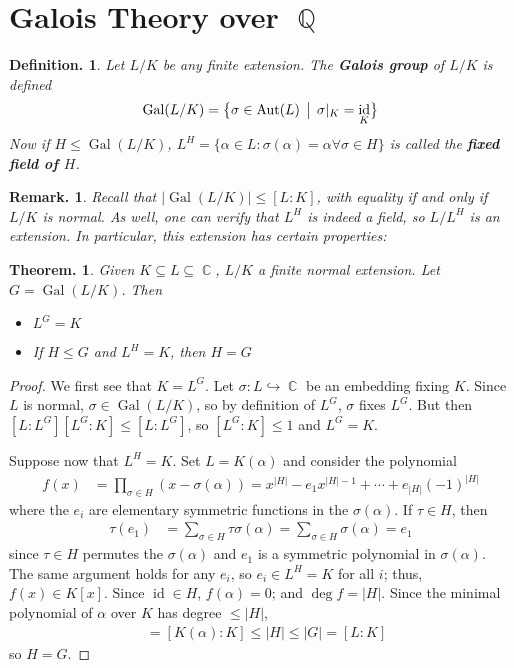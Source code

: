 \documentclass[11pt, a4paper]{memoir}
\DeclareMathOperator{\Q}{{\mathbb{Q}}}
\DeclareMathOperator{\C}{{\mathbb{C}}}
\newcommand{\hto}[0]{\ensuremath{\hookrightarrow}}
\theoremstyle{change}
\newtheorem{theorem}{Theorem.}[section]
\theoremstyle{plain}
\theoremstyle{nonumberplain}
\newtheorem{definition}{Definition.}
\newtheorem{remark}{Remark.}
\newtheorem{proof}{Proof}
\DeclareMathOperator{\Aut}{Aut}
\DeclareMathOperator{\Gal}{Gal}
\DeclareMathOperator{\id}{id}
\newcommand{\mbf}[1]{{\boldmath\bfseries #1}}
\numberwithin{equation}{section}
\begin{document}
\section{Galois Theory over \texorpdfstring{$\Q$}{Q}}
\begin{definition}
    Let $L/K$ be any finite extension.
    The \mbf{Galois group} of $L/K$ is defined
    \begin{equation*}
        \Gal(L/K)=\bigl\{\sigma\in\Aut(L)\,\bigm|\,\sigma|_K=\id_K\bigr\}
    \end{equation*}
    Now if $H\leq\Gal(L/K)$, $L^H=\{\alpha\in L:\sigma(\alpha)=\alpha\forall\sigma\in H\}$ is called the \mbf{fixed field of $H$}.
\end{definition}
\begin{remark}
    Recall that $|\Gal(L/K)|\leq[L:K]$, with equality if and only if $L/K$ is normal.
    As well, one can verify that $L^H$ is indeed a field, so $L/L^H$ is an extension.
    In particular, this extension has certain properties:
\end{remark}
\begin{theorem}\label{t:galfix}
    Given $K\subseteq L\subseteq\C$, $L/K$ a finite normal extension.
    Let $G=\Gal(L/K)$.
    Then
    \begin{itemize}[nolistsep]
        \item $L^G=K$
        \item If $H\leq G$ and $L^H=K$, then $H=G$
    \end{itemize}
\end{theorem}
\begin{proof}
    We first see that $K=L^G$.
    Let $\sigma:L\hto\C$ be an embedding fixing $K$.
    Since $L$ is normal, $\sigma\in\Gal(L/K)$, so by definition of $L^G$, $\sigma$ fixes $L^G$.
    But then $[L:L^G][L^G:K]\leq[L:L^G]$, so $[L^G:K]\leq 1$ and $L^G=K$.

    Suppose now that $L^H=K$.
    Set $L=K(\alpha)$ and consider the polynomial
    \begin{align*}
        f(x) &= \prod_{\sigma\in H}(x-\sigma(\alpha))= x^{|H|}-e_1x^{|H|-1}+\cdots+e_{|H|}(-1)^{|H|}
    \end{align*}
    where the $e_i$ are elementary symmetric functions in the $\sigma(\alpha)$.
    If $\tau\in H$, then
    \begin{align*}
        \tau(e_1)&=\sum\limits_{\sigma\in H}\tau\sigma(\alpha)= \sum\limits_{\sigma\in H}\sigma(\alpha)=e_1
    \end{align*}
    since $\tau\in H$ permutes the $\sigma(\alpha)$ and $e_1$ is a symmetric polynomial in $\sigma(\alpha)$.
    The same argument holds for any $e_i$, so $e_i\in L^H=K$ for all $i$; thus, $f(x)\in K[x]$.
    Since $\id\in H$, $f(\alpha)=0$; and $\deg f=|H|$.
    Since the minimal polynomial of $\alpha$ over $K$ has degree $\leq|H|$,
    \begin{align*}
        [L:K] &= [K(\alpha):K]\leq|H|\leq|G|=[L:K]
    \end{align*}
    so $H=G$.
\end{proof}
\end{document}
